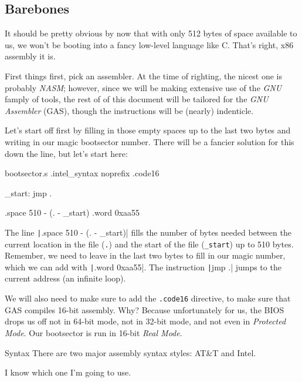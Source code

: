 \documentclass{article}
\begin{document}
\subsection{Barebones}

It should be pretty obvious by now that with only 512 bytes of space available to us, we won't be booting into
a fancy low-level language like C. That's right, x86 assembly it is.

First things first, pick an assembler. At the time of righting, the nicest one is probably \emph{NASM}; however,
since we will be making extensive use of the \emph{GNU} famply of tools, the rest of of this document will be
tailored for the \emph{GNU Assembler} (GAS), though the instructions will be (nearly) indenticle.

Let's start off first by filling in those empty spaces up to the last two bytes and writing in our magic
bootsector number. There will be a fancier solution for this down the line, but let's start here:

\begin{gas}{bootsector.s}
	.intel_syntax noprefix
	.code16
	
	_start:
		jmp .
	
	.space 510 - (. - _start)
	.word 0xaa55
\end{gas}

The line \texttt|.space 510 - (. - _start)| fills the number of bytes needed between the current
location in the file (\Verb|.|) and the start of the file (\Verb|_start|) up to 510 bytes. Remember, we need to
leave in the last two bytes to fill in our magic number, which we can add with \texttt|.word 0xaa55|.
The instruction \texttt|jmp .| jumps to the current address (an infinite loop).

We will also need to make sure to add the \Verb|.code16| directive, to make sure that GAS compiles 16-bit assembly.
Why? Because unfortunately for us, the BIOS drops us off not in 64-bit mode, not in 32-bit mode, and not even
in \emph{Protected Mode}. Our bootsector is run in 16-bit \emph{Real Mode}.

\begin{info}{Syntax}
	There are two major assembly syntax styles: AT\&T and Intel.
	
	\begin{multicols}{2}
		\textbf{AT\&T}
		
		\texttt|movl $10, %
		
		\columnbreak
		
		\textbf{Intel}
		
		\texttt|mov eax, 10|
	\end{multicols}
	
	I know which one I'm going to use.
\end{info}
\end{document}
